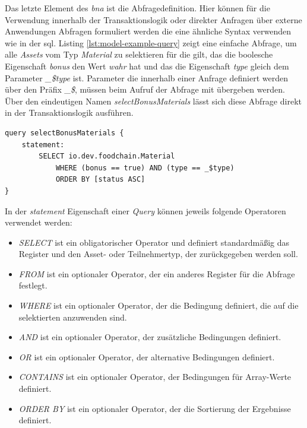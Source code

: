 \noindent
Das letzte Element des \textit{\acf{bna}} ist die Abfragedefinition. Hier können für die Verwendung innerhalb der Transaktionslogik oder direkter Anfragen über externe Anwendungen Abfragen formuliert werden die eine ähnliche Syntax verwenden wie in der \ac{sql}. Listing \ref{lst:model-example-query} zeigt eine einfache Abfrage, um alle \textit{Assets} vom Typ \textit{Material} zu selektieren für die gilt, das die boolesche Eigenschaft \textit{bonus} den Wert \textit{wahr} hat und das die Eigenschaft \textit{type} gleich dem Parameter \textit{\_\$type} ist. Parameter die innerhalb einer Anfrage definiert werden über den Präfix \textit{\_\$}, müssen beim Aufruf der Abfrage mit übergeben werden. Über den eindeutigen Namen \textit{selectBonusMaterials} lässt sich diese Abfrage direkt in der Transaktionslogik ausführen.

\begin{lstlisting}[caption={Abfragedefinition},label=lst:model-example-query]
query selectBonusMaterials {
    statement:
        SELECT io.dev.foodchain.Material
            WHERE (bonus == true) AND (type == _$type)
            ORDER BY [status ASC]
}
\end{lstlisting}

\noindent
In der \textit{statement} Eigenschaft einer \textit{Query} können jeweils folgende Operatoren verwendet werden:

\begin{itemize}
    \item \textit{SELECT} ist ein obligatorischer Operator und definiert standardmäßig das Register und den Asset- oder Teilnehmertyp, der zurückgegeben werden soll.
    \item \textit{FROM} ist ein optionaler Operator, der ein anderes Register für die Abfrage festlegt.
    \item \textit{WHERE} ist ein optionaler Operator, der die Bedingung definiert, die auf die selektierten anzuwenden sind.
    \item \textit{AND} ist ein optionaler Operator, der zusätzliche Bedingungen definiert.
    \item \textit{OR} ist ein optionaler Operator, der alternative Bedingungen definiert.
    \item \textit{CONTAINS} ist ein optionaler Operator, der Bedingungen für Array-Werte definiert.
    \item \textit{ORDER BY} ist ein optionaler Operator, der die Sortierung der Ergebnisse definiert.
\end{itemize}

